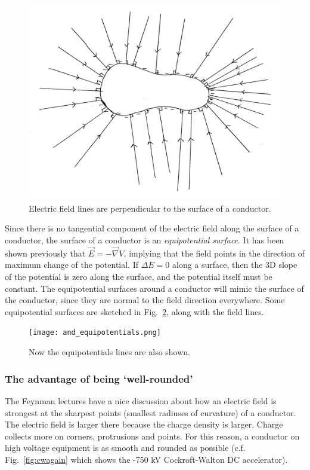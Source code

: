 \documentclass[12pt]{article}
\begin{document}
\begin{flushleft}
\begin{figure}[h]
\centering
\includegraphics*[trim=0cm 0cm 0cm 0cm, clip=true, width=0.5\columnwidth]{fieldlines.png}
\caption{\small Electric field lines are perpendicular to the surface of a conductor.}
\label{fig:wequip}
\end{figure}

Since there is no tangential component of the electric field along the surface of a conductor, the surface of a conductor is an {\color{myblue} {\it equipotential surface}}.  It has been shown previously that $\vec{E}=-\vec{\nabla}V$, implying that the field points in the direction of maximum change of the potential.  If $\Delta E=0$ along a surface, then the 3D slope of the potential is zero along the surface, and the potential itself must be constant.  The equipotential surfaces around a conductor will mimic the surface of the conductor, since they are normal to the field direction everywhere.  Some equipotential surfaces are sketched in Fig.~\ref{fig:wequip}, along with the field lines.

\vspace{.2in}
\begin{figure}[h]
\centering
\texttt{[image: and\_equipotentials.png]}
\caption{\small Now the equipotentials lines are also shown.}
\label{fig:wequip}
\end{figure}

\subsubsection*{\bf The advantage of being `well-rounded'}

The Feynman lectures have a nice discussion about how an electric field is strongest at the sharpest points (smallest radiuses of curvature) of a conductor.  The electric field is larger there because the charge density is larger.  Charge collects more on corners, protrusions and points.  For this reason, a conductor on high voltage equipment is as smooth and rounded as possible (c.f. Fig.~\ref{fig:cwagain} which shows the -750 kV Cockroft-Walton DC accelerator).


\end{flushleft}
\end{document}
